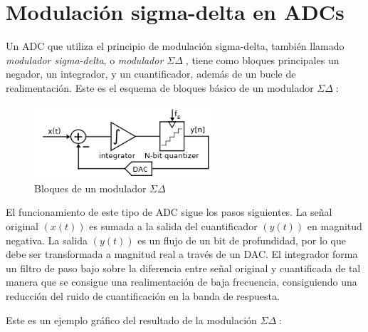 \documentclass[12pt]{report} %
\newcommand{\sigmadelta}{$\Sigma\Delta\; $}
\begin{document}
	\section{Modulación sigma-delta en ADCs}
	
	Un ADC que utiliza el principio de modulación sigma-delta, también llamado \textit{modulador sigma-delta}, o \textit{modulador \sigmadelta}, tiene como bloques principales un negador, un integrador, y un cuantificador, además de un bucle de realimentación. Este es el esquema de bloques básico de un modulador \sigmadelta:
	
	\begin{figure}[H]
		\includegraphics[width=0.6\textwidth]{sigma-delta-blocks.png}
		\caption[Bloques de un modulador \sigmadelta]{Bloques de un modulador \sigmadelta\protect\footnotemark}
		\label{fig:sigma-delta-blocks.png}
	\end{figure}
	
	El funcionamiento de este tipo de ADC sigue los pasos siguientes. La señal original $( x(t) )$ es sumada a la salida del cuantificador $( y(t) )$ en magnitud negativa. La salida $( y(t) )$ es un flujo de un bit de profundidad, por lo que debe ser transformada a magnitud real a través de un DAC. El integrador forma un filtro de paso bajo sobre la diferencia entre señal original y cuantificada de tal manera que se consigue una realimentación de baja frecuencia, consiguiendo una reducción del ruido de cuantificación en la banda de respuesta.
	
	Este es un ejemplo gráfico del resultado de la modulación \sigmadelta:
	
\end{document}
